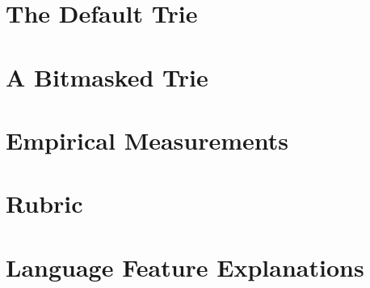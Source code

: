 \documentclass{article}
\begin{document}
\section{The Default Trie}

\section{A Bitmasked Trie}

\section{Empirical Measurements}

\section{Rubric}

\section{Language Feature Explanations}
\end{document}
